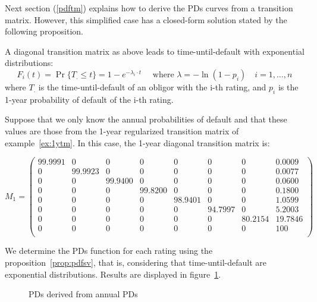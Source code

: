 \documentclass[11pt,fleqn]{book} %
\begin{document}
Next section (\ref{pdftm}) explains how to derive the PDs curves from a 
transition matrix. However, this simplified case has a closed-form solution 
stated by the following proposition.

\begin{proposition}
	\label{prop:pdfsv}
	A diagonal transition matrix as above leads to time-until-default with 
	exponential distributions:
	\begin{displaymath}
		F_i(t) = \Pr\{T_. \le t\} = 1 - e^{-\lambda_i \cdot t} 
		\quad \text{ where } \lambda = -\ln(1-p_i)
		\quad i=1,\dots,n
	\end{displaymath}
	where $T_.$ is the time-until-default of an obligor with the i-th rating,
	and $p_i$ is the 1-year probability of default of the i-th rating. 
\end{proposition}

\begin{example}
	\label{ex:pdfsv}
	Suppose that we only know the annual probabilities of default and that these 
	values are those from the 1-year regularized transition matrix of 
	example~\ref{ex:1ytm}. In this case, the 1-year diagonal transition matrix 
	is:
	{\small
	\begin{displaymath}
		M_1 = \left(
		\begin{array}{cccccccc}
			99.9991 & 0 & 0 & 0 & 0 & 0 & 0 & 0.0009 \\
			0 & 99.9923 & 0 & 0 & 0 & 0 & 0 & 0.0077 \\
			0 & 0 & 99.9400 & 0 & 0 & 0 & 0 & 0.0600 \\
			0 & 0 & 0 & 99.8200 & 0 & 0 & 0 & 0.1800 \\
			0 & 0 & 0 & 0 & 98.9401 & 0 & 0 & 1.0599 \\
			0 & 0 & 0 & 0 & 0 & 94.7997 & 0 & 5.2003 \\
			0 & 0 & 0 & 0 & 0 & 0 & 80.2154 & 19.7846 \\
			0 & 0 & 0 & 0 & 0 & 0 & 0 & 100 \\
		\end{array}
		\right)
	\end{displaymath}\par}
	We determine the PDs function for each rating using the 
	proposition~\ref{prop:pdfsv}, that is, considering that time-until-default
	are exponential distributions. Results are displayed in figure~\ref{fig:pdfsv}. 
	\begin{figure}[!ht]
		\centering
		\caption{PDs derived from annual PDs}
		\label{fig:pdfsv}
	\end{figure}
\end{example}
\end{document}
